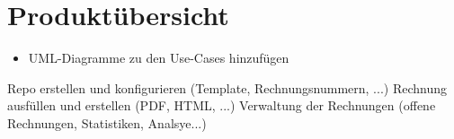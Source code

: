 
\section{Produktübersicht}

\begin{itemize}
	\item UML-Diagramme zu den Use-Cases hinzufügen
\end{itemize}

Repo erstellen und konfigurieren (Template, Rechnungsnummern, ...)
Rechnung ausfüllen und erstellen (PDF, HTML, ...)
Verwaltung der Rechnungen (offene Rechnungen, Statistiken, Analsye...)